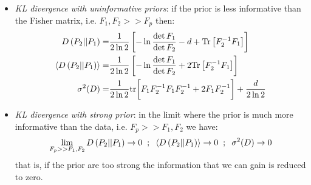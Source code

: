 \documentclass[prd,nofootinbib,showpacs]{revtex4}
\begin{document}
\begin{itemize}
\item {\it KL divergence with uninformative priors}: if the prior is less informative than the Fisher matrix, i.e. $F_1, F_2 >> F_p$ then:
%
\begin{align}
D\left( P_2 || P_ 1 \right)  =& \frac{1}{2\ln 2} \left[ -\ln \frac{\det F_1}{\det  F_2 } -d +{\rm Tr}\left[ F_2^{-1} F_1 \right]\right] \nonumber  \\
\langle D\left( P_2 || P_ 1 \right) \rangle  =&  \frac{1}{2\ln 2} \left[ -\ln \frac{\det F_1}{\det  F_2 } +2{\rm Tr}\left[ F_2^{-1} F_1 \right]\right] \nonumber \\
\sigma^2(D) =& \frac{1}{2\ln 2} {\rm tr} \bigg[ F_1F_2^{-1}F_1F_2^{-1} + 2F_1F_2^{-1}\bigg]  +\frac{d}{2\ln 2}
\end{align}
%
\item {\it KL divergence with strong prior}: in the limit where the prior is much more informative than the data, i.e. $F_p >> F_1, F_2$ we have:
%
\begin{align}
\lim_{F_p >> F_1, F_2} D\left( P_2 || P_ 1 \right) \rightarrow 0 \hspace{0.2cm};\hspace{0.2cm} \langle D\left( P_2 || P_ 1 \right) \rangle \rightarrow 0 \hspace{0.2cm};\hspace{0.2cm} \sigma^2(D) \rightarrow 0
\end{align}
%
that is, if the prior are too strong the information that we can gain is reduced to zero.
\end{itemize}

%
\end{document}

